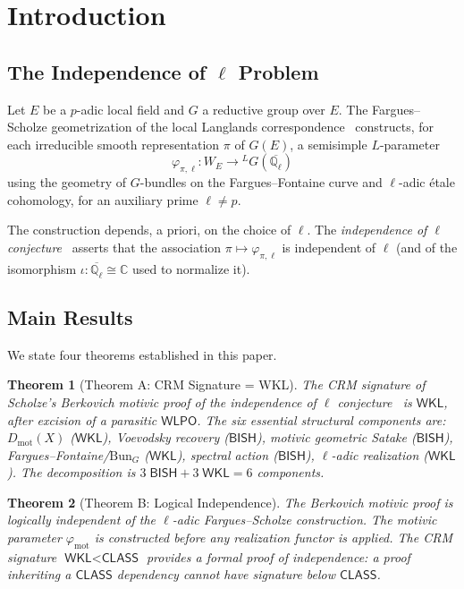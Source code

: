 \documentclass[11pt,a4paper]{article}
\theoremstyle{plain}
\newtheorem{theorem}{Theorem}[section]
\theoremstyle{definition}
\newcommand{\BISH}{\textsf{BISH}}
\newcommand{\WKL}{\textsf{WKL}}
\newcommand{\WLPO}{\textsf{WLPO}}
\newcommand{\CLASS}{\textsf{CLASS}}
\newcommand{\Dmot}{D_{\mathrm{mot}}}
\newcommand{\Bun}{\mathrm{Bun}}
\newcommand{\Q}{\mathbb{Q}}
\newcommand{\C}{\mathbb{C}}
\begin{document}
\tableofcontents
\newpage

\section{Introduction}\label{sec:intro}

\subsection{The Independence of $\ell$ Problem}

Let $E$ be a $p$-adic local field and $G$ a reductive group over $E$. The Fargues--Scholze geometrization of the local Langlands correspondence~\cite{fargues-scholze21} constructs, for each irreducible smooth representation $\pi$ of $G(E)$, a semisimple $L$-parameter
\[
\varphi_{\pi,\ell} : W_E \longrightarrow {}^L G(\overline{\Q_\ell})
\]
using the geometry of $G$-bundles on the Fargues--Fontaine curve and $\ell$-adic \'etale cohomology, for an auxiliary prime $\ell \neq p$.

The construction depends, a priori, on the choice of $\ell$. The \emph{independence of $\ell$ conjecture}~\cite[Conjecture~I.9.5]{fargues-scholze21} asserts that the association $\pi \mapsto \varphi_{\pi,\ell}$ is independent of $\ell$ (and of the isomorphism $\iota: \overline{\Q_\ell} \cong \C$ used to normalize it).

\subsection{Main Results}

We state four theorems established in this paper.

\begin{theorem}[Theorem A: CRM Signature = WKL]\label{thm:A}
The CRM signature of Scholze's Berkovich motivic proof of the independence of $\ell$ conjecture~\cite{scholze-berkovich, scholze-motivic-geometrization} is $\WKL$, after excision of a parasitic $\WLPO$. The six essential structural components are: $\Dmot(X)$ ($\WKL$), Voevodsky recovery ($\BISH$), motivic geometric Satake ($\BISH$), Fargues--Fontaine/$\Bun_G$ ($\WKL$), spectral action ($\BISH$), $\ell$-adic realization ($\WKL$). The decomposition is $3\;\BISH + 3\;\WKL = 6$ components.
\end{theorem}

\begin{theorem}[Theorem B: Logical Independence]\label{thm:B}
The Berkovich motivic proof is logically independent of the $\ell$-adic Fargues--Scholze construction. The motivic parameter $\varphi_{\mathrm{mot}}$ is constructed before any realization functor is applied. The CRM signature $\WKL < \CLASS$ provides a formal proof of independence: a proof inheriting a $\CLASS$ dependency cannot have signature below $\CLASS$.
\end{theorem}
\end{document}
